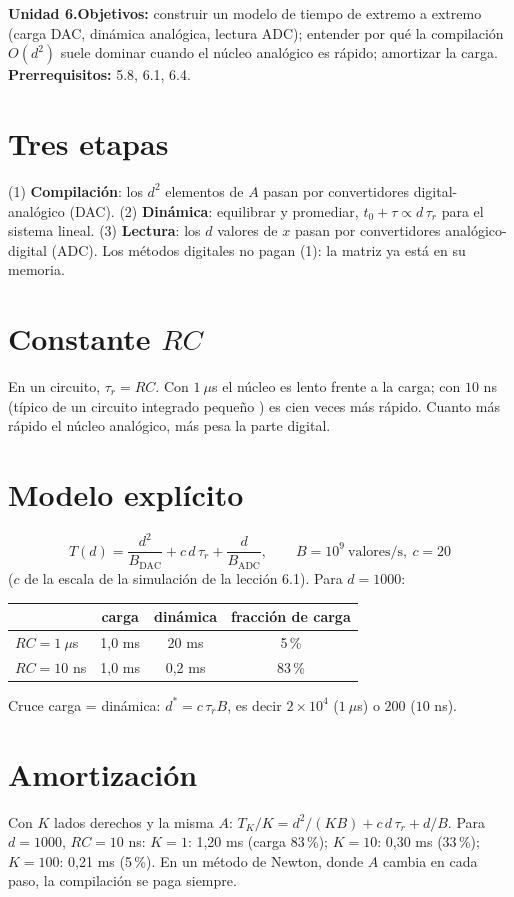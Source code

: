 \documentclass[11pt,a4paper]{article}
\begin{document}

\noindent\textbf{Unidad 6.}\quad\textbf{Objetivos:} construir un modelo de tiempo de extremo a extremo (carga DAC, dinámica analógica, lectura ADC); entender
por qué la compilación $O(d^2)$ suele dominar cuando el núcleo analógico es rápido; amortizar la carga.
\textbf{Prerrequisitos:} 5.8, 6.1, 6.4.

\section{Tres etapas}
(1) \textbf{Compilación}: los $d^2$ elementos de $A$ pasan por convertidores digital-analógico (DAC). (2) \textbf{Dinámica}: equilibrar y promediar,
$t_0+\tau\propto d\,\tau_r$ para el sistema lineal. (3) \textbf{Lectura}: los $d$ valores de $x$ pasan por convertidores analógico-digital (ADC). Los métodos
digitales no pagan (1): la matriz ya está en su memoria.

\section{Constante \texorpdfstring{$RC$}{RC}}
En un circuito, $\tau_r=RC$. Con $1\ \mu$s el núcleo es lento frente a la carga; con $10$ ns (típico de un circuito integrado pequeño \evE) es cien veces
más rápido. Cuanto más rápido el núcleo analógico, más pesa la parte digital.

\section{Modelo explícito \evE}
\[T(d)=\frac{d^2}{B_{\text{DAC}}}+c\,d\,\tau_r+\frac{d}{B_{\text{ADC}}},\qquad B=10^9\ \text{valores/s},\ c=20\]
($c$ de la escala de la simulación de la lección 6.1). Para $d=1000$:
\begin{center}\begin{tabular}{lccc}\toprule
& carga & dinámica & fracción de carga\\\midrule
$RC=1\ \mu$s & 1,0 ms & 20 ms & 5\,\%\\
$RC=10$ ns & 1,0 ms & 0,2 ms & 83\,\%\\\bottomrule\end{tabular}\end{center}
Cruce carga = dinámica: $d^\ast=c\,\tau_rB$, es decir $2\times10^4$ ($1\ \mu$s) o $200$ ($10$ ns).

\section{Amortización}
Con $K$ lados derechos y la misma $A$: $T_K/K=d^2/(KB)+c\,d\,\tau_r+d/B$. Para $d=1000$, $RC=10$ ns: $K=1$: 1,20 ms (carga 83\,\%); $K=10$: 0,30 ms (33\,\%);
$K=100$: 0,21 ms (5\,\%). En un método de Newton, donde $A$ cambia en cada paso, la compilación se paga siempre.
\end{document}
